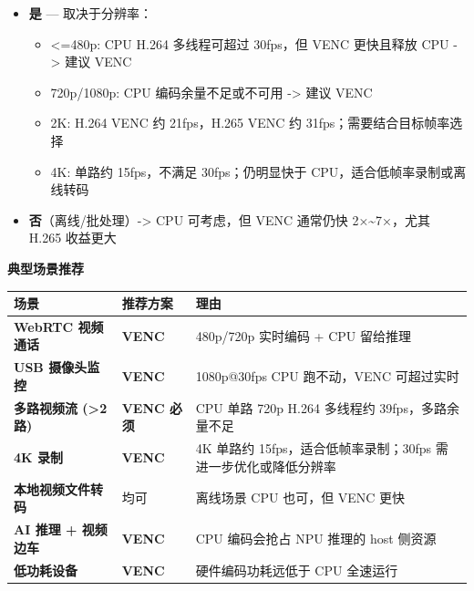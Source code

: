 \begin{itemize}
\tightlist
\item
  \textbf{是} --- 取决于分辨率：

  \begin{itemize}
  \tightlist
  \item
    \textless=480p: CPU H.264 多线程可超过 30fps，但 VENC 更快且释放 CPU
    -\textgreater{} 建议 VENC
  \item
    720p/1080p: CPU 编码余量不足或不可用 -\textgreater{} 建议 VENC
  \item
    2K: H.264 VENC 约 21fps，H.265 VENC 约 31fps；需要结合目标帧率选择
  \item
    4K: 单路约 15fps，不满足 30fps；仍明显快于
    CPU，适合低帧率录制或离线转码
  \end{itemize}
\item
  \textbf{否}（离线/批处理）-\textgreater{} CPU 可考虑，但 VENC 通常仍快
  2×\textasciitilde7×，尤其 H.265 收益更大
\end{itemize}

\textbf{典型场景推荐}

\begin{longtable}[]{@{}
  >{\raggedright\arraybackslash}p{}
  >{\raggedright\arraybackslash}p{}
  >{\raggedright\arraybackslash}p{}@{}}
\toprule\noalign{}
\begin{minipage}[b]{\linewidth}\raggedright
场景
\end{minipage} & \begin{minipage}[b]{\linewidth}\raggedright
推荐方案
\end{minipage} & \begin{minipage}[b]{\linewidth}\raggedright
理由
\end{minipage} \\
\midrule\noalign{}
\endhead
\bottomrule\noalign{}
\endlastfoot
\textbf{WebRTC 视频通话} & \textbf{VENC} & 480p/720p 实时编码 + CPU
留给推理 \\
\textbf{USB 摄像头监控} & \textbf{VENC} & 1080p@30fps CPU 跑不动，VENC
可超过实时 \\
\textbf{多路视频流 (\textgreater2 路)} & \textbf{VENC 必须} & CPU 单路
720p H.264 多线程约 39fps，多路余量不足 \\
\textbf{4K 录制} & \textbf{VENC} & 4K 单路约
15fps，适合低帧率录制；30fps 需进一步优化或降低分辨率 \\
\textbf{本地视频文件转码} & 均可 & 离线场景 CPU 也可，但 VENC 更快 \\
\textbf{AI 推理 + 视频边车} & \textbf{VENC} & CPU 编码会抢占 NPU 推理的
host 侧资源 \\
\textbf{低功耗设备} & \textbf{VENC} & 硬件编码功耗远低于 CPU 全速运行 \\
\end{longtable}

